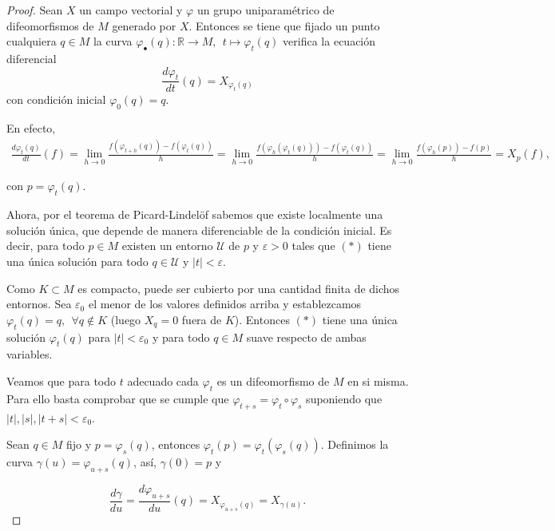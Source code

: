 \begin{proof}
    Sean $X$ un campo vectorial y $\varphi$ un grupo uniparamétrico de difeomorfismos de $M$ generado por $X$. Entonces se tiene que fijado un punto cualquiera $q\in M$ la curva $\varphi_\bullet(q): \mathbb{R}\to M,~~ t\mapsto \varphi_t(q)$ verifica la ecuación diferencial
    \begin{equation*}
        \frac{d\varphi_t}{dt}(q)=X_{\varphi_t(q)}\tag{$\ast$}
    \end{equation*}
    con condición inicial $\varphi_0(q)=q$.

    En efecto,
    \begin{align*}
        \frac{d\varphi_t(q)}{dt}(f)=\lim_{h\to 0} \frac{f(\varphi_{t+h}(q))- f(\varphi_t(q))}{h} = \lim_{h\to 0} \frac{f(\varphi_{h}(\varphi_t(q)))- f(\varphi_t(q))}{h} = \lim_{h\to 0} \frac{f(\varphi_{h}(p))- f(p)}{h} = X_p(f),
    \end{align*}

    con $p=\varphi_t(q)$.

    Ahora, por el teorema de Picard-Lindelöf sabemos que existe localmente una solución única, que depende de manera diferenciable de la condición inicial. Es decir, para todo $ p\in M$ existen un entorno $\mathcal{U}$ de $p$ y $\varepsilon > 0$ tales que $(\ast)$ tiene una única solución para todo $q\in \mathcal{U}$ y $|t|<\varepsilon$.

    Como $K\subset M$ es compacto, puede ser cubierto por una cantidad finita de dichos entornos. Sea $\varepsilon_0$ el menor de los valores definidos arriba y establezcamos $\varphi_t(q)=q,~~\forall q\notin K$ (luego $X_q=0$ fuera de $K$). Entonces $(\ast)$ tiene una única solución $\varphi_t(q)$ para $|t|<\varepsilon_0$ y para todo $q\in M$ suave respecto de ambas variables.

    Veamos que para todo $t$ adecuado cada $\varphi_t$ es un difeomorfismo de $M$ en si misma. Para ello basta comprobar que se cumple que $\varphi_{t+s}=\varphi_t\circ \varphi_s$ suponiendo que $|t|,|s|,|t+s|<\varepsilon_0$.

    Sean $q\in M$ fijo y  $p=\varphi_s(q)$, entonces $\varphi_t(p)=\varphi_t(\varphi_s(q))$. Definimos la curva $\gamma(u)=\varphi_{u+s}(q)$, así, $\gamma(0)=p$ y 
    
    \begin{equation*}
        \frac{d\gamma}{du}=\frac{d\varphi_{u+s}}{du}(q)=X_{\varphi_{u+s}(q)}=X_{\gamma (u)}.
    \end{equation*} 
    

\end{proof}
